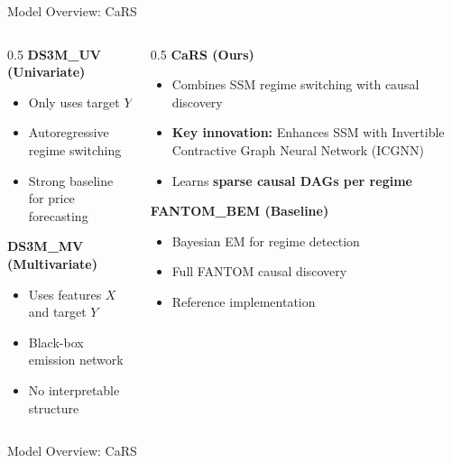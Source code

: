 \documentclass[aspectratio=169]{beamer}
\begin{document}
\begin{frame}{Model Overview: CaRS}
\small
\begin{columns}
\begin{column}{0.5\textwidth}
\textbf{DS3M\_UV (Univariate)}
\begin{itemize}
    \item Only uses target $Y$
    \item Autoregressive regime switching
    \item Strong baseline for price forecasting
\end{itemize}

\vspace{0.3cm}
\textbf{DS3M\_MV (Multivariate)}
\begin{itemize}
    \item Uses features $X$ and target $Y$
    \item Black-box emission network
    \item No interpretable structure
\end{itemize}
\end{column}

\begin{column}{0.5\textwidth}
\textbf{CaRS (Ours)}
\begin{itemize}
    \item Combines SSM regime switching with causal discovery
    \item \textbf{Key innovation:} Enhances SSM with Invertible Contractive Graph Neural Network (ICGNN)%
    \item Learns \textbf{sparse causal DAGs per regime}
\end{itemize}

\textbf{FANTOM\_BEM (Baseline)}
\begin{itemize}
    \item Bayesian EM for regime detection
    \item Full FANTOM causal discovery
    \item Reference implementation
\end{itemize}
\end{column}
\end{columns}
\end{frame}

\begin{frame}{Model Overview: CaRS}
\begin{center}
\end{center}
\end{frame}
\end{document}

